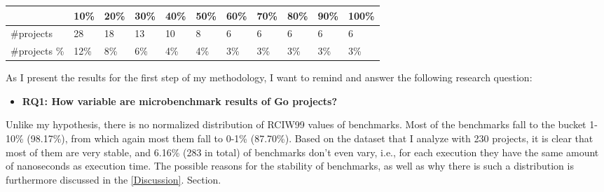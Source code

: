 \documentclass{seal_thesis}
\begin{document}
\begin{table}[H]
\begin{tabular}{lllllllllll}
		\rowcolor[HTML]{FFCCC9} 
		\multicolumn{1}{|l|}{\cellcolor[HTML]{FFCCC9}Percentage} & \multicolumn{1}{l|}{\cellcolor[HTML]{FFCCC9}10\%} & \multicolumn{1}{l|}{\cellcolor[HTML]{FFCCC9}20\%} & \multicolumn{1}{l|}{\cellcolor[HTML]{FFCCC9}30\%} & \multicolumn{1}{l|}{\cellcolor[HTML]{FFCCC9}40\%} & \multicolumn{1}{l|}{\cellcolor[HTML]{FFCCC9}50\%} & \multicolumn{1}{l|}{\cellcolor[HTML]{FFCCC9}60\%} & \multicolumn{1}{l|}{\cellcolor[HTML]{FFCCC9}70\%} & \multicolumn{1}{l|}{\cellcolor[HTML]{FFCCC9}80\%} & \multicolumn{1}{l|}{\cellcolor[HTML]{FFCCC9}90\%} & \multicolumn{1}{l|}{\cellcolor[HTML]{FFCCC9}100\%} \\ \hline
		\multicolumn{1}{|l|}{\#projects}                         & \multicolumn{1}{l|}{28}                           & \multicolumn{1}{l|}{18}                           & \multicolumn{1}{l|}{13}                           & \multicolumn{1}{l|}{10}                           & \multicolumn{1}{l|}{8}                            & \multicolumn{1}{l|}{6}                            & \multicolumn{1}{l|}{6}                            & \multicolumn{1}{l|}{6}                            & \multicolumn{1}{l|}{6}                            & \multicolumn{1}{l|}{6}                             \\ \hline
		\multicolumn{1}{|l|}{\#projects \%}                      & \multicolumn{1}{l|}{12\%}                         & \multicolumn{1}{l|}{8\%}                          & \multicolumn{1}{l|}{6\%}                          & \multicolumn{1}{l|}{4\%}                          & \multicolumn{1}{l|}{4\%}                          & \multicolumn{1}{l|}{3\%}                          & \multicolumn{1}{l|}{3\%}                          & \multicolumn{1}{l|}{3\%}                          & \multicolumn{1}{l|}{3\%}                          & \multicolumn{1}{l|}{3\%}                           \\ \hline
	\end{tabular}
\end{table}

\noindent As I present the results for the first step of my methodology, I want to remind and answer the following research question:

\begin{itemize}
	\item \textbf{RQ1: How variable are microbenchmark results of Go projects?}
\end{itemize}

\noindent Unlike my hypothesis, there is no normalized distribution of RCIW99 values of benchmarks. Most of the benchmarks fall to the bucket 1-10\% (98.17\%), from which again most them fall to 0-1\% (87.70\%). Based on the dataset that I analyze with 230 projects, it is clear that most of them are very stable, and 6.16\% (283 in total) of benchmarks don't even vary, i.e., for each execution they have the same amount of nanoseconds as execution time. The possible reasons for the stability of benchmarks, as well as why there is such a distribution is furthermore discussed in the \ref{Discussion}. Section.
\end{document}
